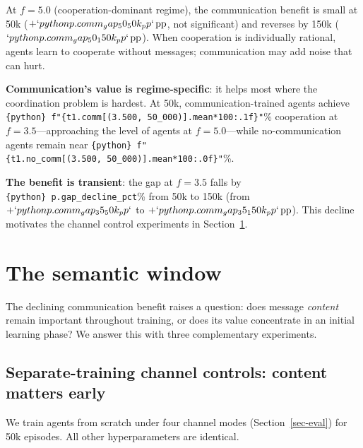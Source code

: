 \documentclass[
  10pt,
  letterpaper,
]{article}
\newcommand{\pp}{\text{\,pp}}
\begin{document}
At \(f = 5.0\) (cooperation-dominant regime), the communication benefit
is small at 50k (\(+`{python} p.comm_gap_50_50k_pp`\pp\), not
significant) and reverses by 150k
(\(`{python} p.comm_gap_50_150k_pp`\pp\)). When cooperation is
individually rational, agents learn to cooperate without messages;
communication may add noise that can hurt.

\textbf{Communication's value is regime-specific}: it helps most where
the coordination problem is hardest. At 50k, communication-trained
agents achieve
\texttt{\{python\}\ f"\{t1.comm{[}(\textquotesingle{}3.500\textquotesingle{},\ 50\_000){]}.mean*100:.1f\}"}\%
cooperation at \(f = 3.5\)---approaching the level of agents at
\(f = 5.0\)---while no-communication agents remain near
\texttt{\{python\}\ f"\{t1.no\_comm{[}(\textquotesingle{}3.500\textquotesingle{},\ 50\_000){]}.mean*100:.0f\}"}\%.

\textbf{The benefit is transient}: the gap at \(f = 3.5\) falls by
\texttt{\{python\}\ p.gap\_decline\_pct}\% from 50k to 150k (from
\(+`{python} p.comm_gap_35_50k_pp`\) to
\(+`{python} p.comm_gap_35_150k_pp`\pp\)). This decline motivates the
channel control experiments in Section~\ref{sec-semantic-window}.

\hypertarget{sec-semantic-window}{%
\section{The semantic window}\label{sec-semantic-window}}

The declining communication benefit raises a question: does message
\emph{content} remain important throughout training, or does its value
concentrate in an initial learning phase? We answer this with three
complementary experiments.

\hypertarget{sec-separate-controls}{%
\subsection{Separate-training channel controls: content matters
early}\label{sec-separate-controls}}

We train agents from scratch under four channel modes
(Section~\ref{sec-eval}) for 50k episodes. All other hyperparameters are
identical.
\end{document}
